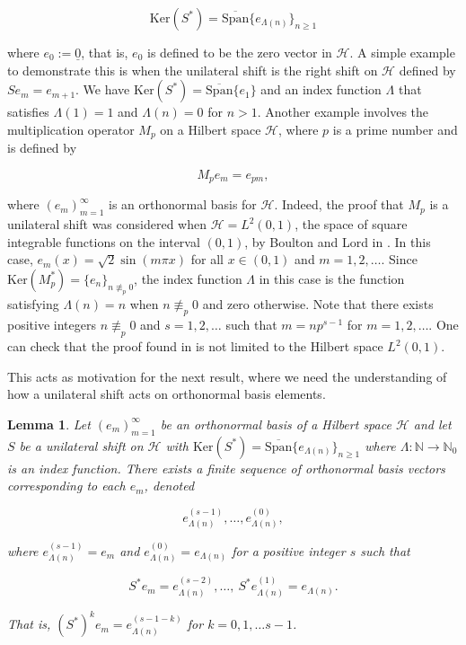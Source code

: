 \documentclass[10pt, reqno]{amsart}
\newtheorem{lemma}[theorem]{Lemma}
\theoremstyle{definition}
\numberwithin{equation}{section}
\begin{document}
\begin{equation}\label{kernelofshiftstar}
\mathrm{Ker}(S^{*})=\overline{\mathrm{Span}}\{e_{\Lambda(n)}\}_{n\geq 1}
\end{equation}

\noindent where $e_{0}:=\underline{0}$, that is, $e_{0}$ is defined to be the zero vector in $\mathcal{H}$. A simple example to demonstrate this is when the unilateral shift is the right shift on $\mathcal{H}$ defined by $Se_{m}=e_{m+1}$. We have $\mathrm{Ker}(S^{*})=\overline{\mathrm{Span}}\{e_{1}\}$ and an index function $\Lambda$ that satisfies $\Lambda(1)=1$ and $\Lambda(n)=0$ for $n>1$. Another example involves the multiplication operator $M_{p}$ on a Hilbert space $\mathcal{H}$, where $p$ is a prime number and is defined by

\begin{equation}\label{mpproperty}
M_{p}e_{m}=e_{pm},
\end{equation}

\noindent where $(e_{m})_{m=1}^{\infty}$ is an orthonormal basis for $\mathcal{H}$. Indeed, the proof that $M_{p}$ is a unilateral shift was considered when $\mathcal{H}=L^{2}(0,1)$, the space of square integrable functions on the interval $(0,1)$, by Boulton and Lord in \cite[Lemma 2]{BL}. In this case, $e_{m}(x)=\sqrt{2}\sin(m\pi x)$ for all $x\in(0,1)$ and $m=1,2,\hdots$. Since $\mathrm{Ker}(M_{p}^{*})=\{e_{n}\}_{n\not\equiv_{p} 0}$, the index function $\Lambda$ in this case is the function satisfying $\Lambda(n)=n$ when $n\not\equiv_{p}0$ and zero otherwise. Note that there exists positive integers $n\not\equiv_{p}0$ and $s=1,2,\hdots$ such that $m=np^{s-1}$ for $m=1,2,\hdots$. One can check that the proof found in \cite[Lemma 2]{BL} is not limited to the Hilbert space $L^{2}(0,1)$. 

This acts as motivation for the next result, where we need the understanding of how a unilateral shift acts on orthonormal basis elements.

\begin{lemma}\label{propforonbshifts}
    Let $(e_{m})_{m=1}^{\infty}$ be an orthonormal basis of a Hilbert space $\mathcal{H}$ and let $S$ be a unilateral shift on $\mathcal{H}$ with $\mathrm{Ker}(S^{*})=\overline{\mathrm{Span}}\{e_{\Lambda(n)}\}_{n\geq 1}$ where $\Lambda:\mathbb{N}\rightarrow\mathbb{N}_{0}$ is an index function. There exists a finite sequence of orthonormal basis vectors corresponding to each $e_{m}$, denoted

    $$e_{\Lambda(n)}^{(s-1)},\hdots,e_{\Lambda(n)}^{(0)},$$

    \noindent where $e_{\Lambda(n)}^{(s-1)}=e_{m}$ and $e_{{\Lambda(n)}}^{(0)}=e_{\Lambda(n)}$ for a positive integer $s$ such that

\begin{equation}\label{sequenceforunishift}
S^{*}e_{m}=e_{\Lambda(n)}^{(s-2)},\hdots,~S^{*}e_{\Lambda(n)}^{(1)}=e_{\Lambda(n)}.
\end{equation}

\noindent That is, $(S^{*})^{k}e_{m}=e_{\Lambda(n)}^{(s-1-k)}$ for $k=0,1,\hdots s-1$. 
\end{lemma}
\end{document}
